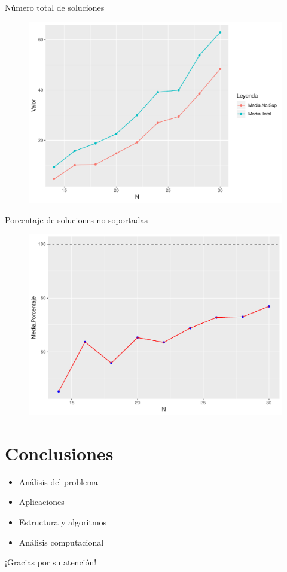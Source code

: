 \documentclass{beamer}
\begin{document}
\begin{frame}{Número total de soluciones}
\begin{figure}[h!]
\centering
\includegraphics[scale=0.47]{plot10}
\end{figure}
\end{frame}
\begin{frame}{Porcentaje de soluciones no soportadas}
\begin{figure}[h!]
\centering
\includegraphics[scale=0.47]{plot11}
\end{figure}
\end{frame}

\section{Conclusiones}

\begin{frame}
\begin{itemize}
\item Análisis del problema
\item Aplicaciones
\item Estructura y algoritmos
\item Análisis computacional
\end{itemize}
\end{frame}
\begin{frame}
\begin{center}
\huge{¡Gracias por su atención!}
\end{center} 
\end{frame}
\end{document}
